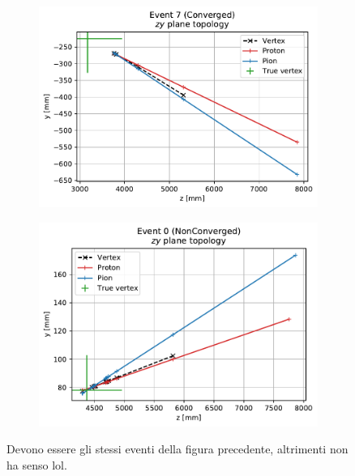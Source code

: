 \begin{figure}[t]
	\centering
	\begin{subfigure}{.45\textwidth}
		\includegraphics[width=\textwidth]{graphics/03-vertex_reconstruction/evt_converged_zy_iter.pdf}
		\caption{}
		\label{fig:zy_iter_conv}
	\end{subfigure}
	\begin{subfigure}{.45\textwidth}
		\includegraphics[width=\textwidth]{graphics/03-vertex_reconstruction/evt_failed_zy_iter.pdf}
		\caption{}
		\label{fig:zy_iter_failed}
	\end{subfigure}
	\caption[A and b.]{Devono essere gli stessi eventi della figura precedente, altrimenti non ha senso lol.}
	\label{fig:zy_iter_conv_vs_failed}
\end{figure}

